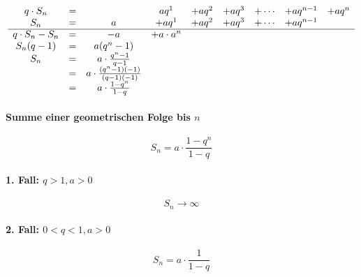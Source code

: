 \[
	\begin{array}{ccccccccc}
		q \cdot S_n       & = &                                           & a q^1         & + a q^2  & + a q^3 & + \cdots & + a q^{n-1} & + a q^n \\
		S_n               & = & a                                         & + a q^1       & + a  q^2 & + a q^3 & + \cdots & + a q^{n-1} &         \\
		\cline{1-9}
		q \cdot S_n - S_n & = & -a                                        & + a \cdot a^n &          &         &          &             &         \\
		S_n(q-1)          & = & a(q^n -1)                                 &               &          &         &          &             &         \\
		S_n               & = & a \cdot \frac{q^n - 1}{q - 1}             &               &          &         &          &             &         \\
		                  & = & a \cdot \frac{(q^n - 1)(-1)}{(q - 1)(-1)} &               &          &         &          &             &         \\
		                  & = & a \cdot \frac{1- q^n}{1 - q}              &               &          &         &          &             &         \\
	\end{array}
\]

\begin{gesetz}
	\paragraph{Summe einer geometrischen Folge bis \(n\)}
	\[
		S_n = a \cdot \frac{1 - q^n}{1 - q}
	\]

	\paragraph{1. Fall: \(q > 1, a > 0\)}

	\[
		S_n \rightarrow \infty
	\]

	\paragraph{2. Fall: \(0 < q < 1, a > 0\)}

	\[
		S_n = a \cdot \frac{1}{1-q}
	\]
\end{gesetz}

